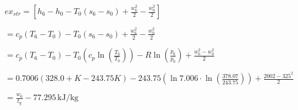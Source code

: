 \( ex_{str} = [h_6 - h_0 - T_0 (s_6 - s_0) + \frac{w_6^2}{2} - \frac{w_0^2}{2}] \)  

\( = c_p (T_6 - T_0) - T_0 (s_6 - s_0) + \frac{w_6^2}{2} - \frac{w_0^2}{2} \)  

\( = c_p (T_6 - T_0) - T_0 \left(c_p \ln \left(\frac{T_6}{T_0}\right)\right) - R \ln \left(\frac{p_6}{p_0}\right) + \frac{w_6^2 - w_0^2}{2} \)  

\( = 0.7006 (328.0 + K - 243.75 K) - 243.75 \left(\ln 7.006 \cdot \ln \left(\frac{378.07}{243.75}\right)\right) + \frac{2002 - 325^2}{2} \)  

\( = \frac{w_6}{t_g} - 77.295 \, \text{kJ/kg} \)